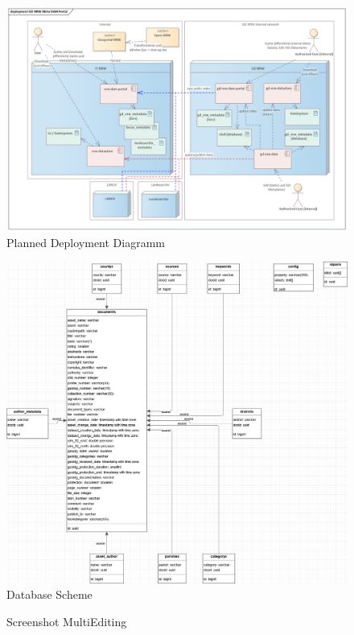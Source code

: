 \documentclass[11pt, titlepage, a4paper]{article}
\begin{document}
\begin{appendices}
    \begin{figure}[H]
        \caption{Planned Deployment Diagramm}
        \label{fig:deployment}
        \includegraphics[width=16cm]{deployment_.png}
        \centering
    \end{figure}
    \begin{figure}[H]
        \caption{Database Scheme}
        \label{fig:db}
        \includegraphics[width=16cm]{db3.png}
        \centering
    \end{figure}
    \begin{figure}[H]
        \caption{Screenshot MultiEditing}
        \label{fig:multiedit}

\end{figure}
\end{appendices}
\end{document}

